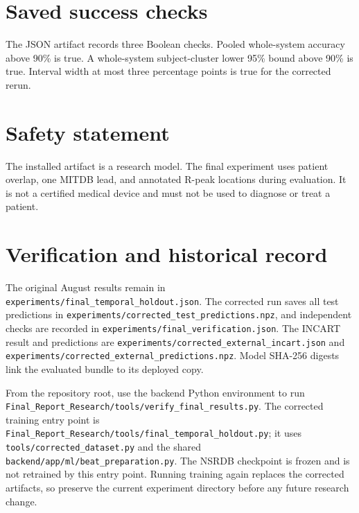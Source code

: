 \section{Saved success checks}

The JSON artifact records three Boolean checks. Pooled whole-system accuracy
above 90\% is true. A whole-system subject-cluster lower 95\% bound above 90\%
is true. Interval width at most three percentage points is true for the corrected rerun.

\section{Safety statement}

The installed artifact is a research model. The final experiment uses patient
overlap, one MITDB lead, and annotated R-peak locations during evaluation. It
is not a certified medical device and must not be used to diagnose or treat a
patient.

\section{Verification and historical record}
The original August results remain in
\nolinkurl{experiments/final_temporal_holdout.json}.
The corrected run saves all test predictions in
\nolinkurl{experiments/corrected_test_predictions.npz}, and independent checks
are recorded in \nolinkurl{experiments/final_verification.json}.
The INCART result and predictions are
\nolinkurl{experiments/corrected_external_incart.json} and
\nolinkurl{experiments/corrected_external_predictions.npz}.
Model SHA-256 digests link the evaluated bundle to its deployed copy.

From the repository root, use the backend Python environment to run
\nolinkurl{Final_Report_Research/tools/verify_final_results.py}.
The corrected training entry point is
\nolinkurl{Final_Report_Research/tools/final_temporal_holdout.py};
it uses \nolinkurl{tools/corrected_dataset.py} and the shared
\nolinkurl{backend/app/ml/beat_preparation.py}.
The NSRDB checkpoint is frozen and is not retrained by this entry point.
Running training again replaces the corrected artifacts, so preserve the
current experiment directory before any future research change.
